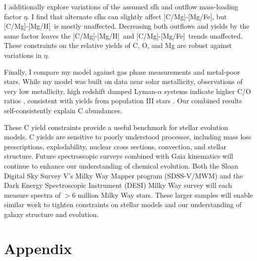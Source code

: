 \documentclass[12pt,oneside,letterpaper]{report}
\newcommand{\sfh}{\gls{sfh}}
\newcommand{\caah}{[C/Mg]-[Mg/H]}
\newcommand{\caafe}{[C/Mg]-[Mg/Fe]}
\begin{document}
I additionally explore variations of the assumed \sfh{} and outflow mass-loading factor $\eta$. I find that alternate \sfh{}s can slightly affect \caafe, but \caah~is mostly unaffected. Decreasing both outflows and yields by the same factor leaves the \caah~and \caafe~trends unaffected. These constraints on the relative yields of C, O, and Mg are robust against variations in $\eta$.

Finally, I compare my model against gas phase measurements and metal-poor stars. While my model was built on data near solar metallicity, observations of very low metallicity, high redshift damped Lyman-$\alpha$ systems indicate higher C/O ratios \citep{cooke+17}, consistent with yields from population III stars \citep[e.g.][]{hirschi07}. Our combined results self-consistently explain C abundances. 

These C yield constraints provide a useful benchmark for stellar evolution models. C yields are sensitive to poorly understood processes, including mass loss prescriptions, explodability, nuclear cross sections, convection, and stellar structure. Future spectroscopic surveys combined with Gaia kinematics \citep{gaia} will continue to enhance our understanding of chemical evolution. Both the Sloan Digital Sky Survey V's Milky Way Mapper program ({\sc SDSS-V/MWM}) \citep{sdssv} and the Dark Energy Spectroscopic Instrument ({\sc DESI}) Milky Way survey \citep{desi, desi:mw} will each measure spectra of $>6$ million Milky Way stars. These larger samples will enable similar work to tighten constraints on stellar models and our understanding of galaxy structure and evolution.



\newpage

 



\appendix
\chapter*{Appendix}
\renewcommand{\thesection}{A.\arabic{section}}
\renewcommand\thefigure{A.\arabic{figure}}    
\renewcommand\theequation{A.\arabic{equation}}    
\setcounter{figure}{0}
\setcounter{equation}{0}

\renewcommand*{\theHsection}{A.\arabic{section}}%
\renewcommand*{\theHsubsection}{A.\arabic{subsection}}%
\renewcommand*{\theHfigure}{A.\arabic{figure}}%
\renewcommand*{\theHequation}{A.\arabic{equation}}%
\end{document}
